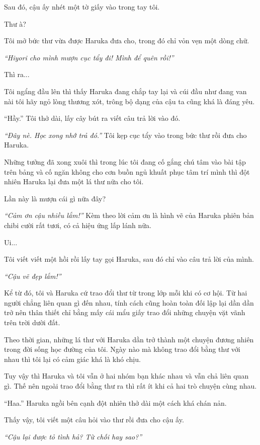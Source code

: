 {Sau đó, cậu ấy nhét một tờ giấy vào trong tay tôi.

Thư à?

Tôi mở bức thư vừa được Haruka đưa cho, trong đó chỉ vỏn vẹn một dòng
chữ.

\emph{``Hiyori cho mình mượn cục tẩy đi! Mình để quên rồi!''}

Thì ra...

Tôi ngẩng đầu lên thì thấy Haruka đang chắp tay lại và cúi đầu như đang
van nài tôi hãy ngỏ lòng thương xót, trông bộ dạng của cậu ta cũng khá
là đáng yêu.

``Hầy.'' Tôi thở dài, lấy cây bút ra viết câu trả lời vào đó.

\emph{``Đây nè. Học xong nhớ trả đó.''} Tôi kẹp cục tẩy vào trong bức
thư rồi đưa cho Haruka.

Những tưởng đã xong xuôi thì trong lúc tôi đang cố gắng chú tâm vào bài
tập trên bảng và cố ngăn không cho cơn buồn ngủ khuất phục tâm trí mình
thì đột nhiên Haruka lại đưa một lá thư nữa cho tôi.

Lần này là mượn cái gì nữa đây?

\emph{``Cảm ơn cậu nhiều lắm!''} Kèm theo lời cảm ơn là hình vẽ của
Haruka phiên bản chibi cười rất tươi, có cả hiệu ứng lấp lánh nữa.

Ui...

Tôi viết viết một hồi rồi lấy tay gọi Haruka, sau đó chỉ vào câu trả lời
của mình.

\emph{``Cậu vẽ đẹp lắm!''}

Kể từ đó, tôi và Haruka cứ trao đổi thư từ trong lớp mỗi khi có cơ hội.
Từ hai người chẳng liên quan gì đến nhau, tính cách cũng hoàn toàn đối
lập lại dần dần trở nên thân thiết chỉ bằng mấy cái mẩu giấy trao đổi
những chuyện vặt vãnh trên trời dười đất.

Theo thời gian, những lá thư với Haruka dần trở thành một chuyện đương
nhiên trong đời sống học đường của tôi. Ngày nào mà không trao đổi bằng
thư với nhau thì tôi lại có cảm giác khá là khó chịu.

Tuy vậy thì Haruka và tôi vẫn ở hai nhóm bạn khác nhau và vẫn chả liên
quan gì. Thế nên ngoài trao đổi bằng thư ra thì rất ít khi cả hai trò
chuyện cùng nhau.

``Haa.'' Haruka ngồi bên cạnh đột nhiên thở dài một cách khá chán nản.

Thấy vậy, tôi viết một câu hỏi vào thư rồi đưa cho cậu ấy.

\emph{``Cậu lại được tỏ tình hả? Từ chối hay sao?''}

}
